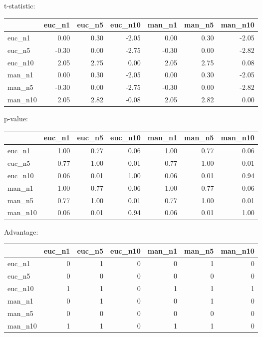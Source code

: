 t-statistic:
 \begin{tabular}{lrrrrrr}
\hline
         &   euc\_n1 &   euc\_n5 &   euc\_n10 &   man\_n1 &   man\_n5 &   man\_n10 \\
\hline
 euc\_n1  &     0.00 &     0.30 &     -2.05 &     0.00 &     0.30 &     -2.05 \\
 euc\_n5  &    -0.30 &     0.00 &     -2.75 &    -0.30 &     0.00 &     -2.82 \\
 euc\_n10 &     2.05 &     2.75 &      0.00 &     2.05 &     2.75 &      0.08 \\
 man\_n1  &     0.00 &     0.30 &     -2.05 &     0.00 &     0.30 &     -2.05 \\
 man\_n5  &    -0.30 &     0.00 &     -2.75 &    -0.30 &     0.00 &     -2.82 \\
 man\_n10 &     2.05 &     2.82 &     -0.08 &     2.05 &     2.82 &      0.00 \\
\hline
\end{tabular} 

p-value:
 \begin{tabular}{lrrrrrr}
\hline
         &   euc\_n1 &   euc\_n5 &   euc\_n10 &   man\_n1 &   man\_n5 &   man\_n10 \\
\hline
 euc\_n1  &     1.00 &     0.77 &      0.06 &     1.00 &     0.77 &      0.06 \\
 euc\_n5  &     0.77 &     1.00 &      0.01 &     0.77 &     1.00 &      0.01 \\
 euc\_n10 &     0.06 &     0.01 &      1.00 &     0.06 &     0.01 &      0.94 \\
 man\_n1  &     1.00 &     0.77 &      0.06 &     1.00 &     0.77 &      0.06 \\
 man\_n5  &     0.77 &     1.00 &      0.01 &     0.77 &     1.00 &      0.01 \\
 man\_n10 &     0.06 &     0.01 &      0.94 &     0.06 &     0.01 &      1.00 \\
\hline
\end{tabular} 

Advantage:
 \begin{tabular}{lrrrrrr}
\hline
         &   euc\_n1 &   euc\_n5 &   euc\_n10 &   man\_n1 &   man\_n5 &   man\_n10 \\
\hline
 euc\_n1  &        0 &        1 &         0 &        0 &        1 &         0 \\
 euc\_n5  &        0 &        0 &         0 &        0 &        0 &         0 \\
 euc\_n10 &        1 &        1 &         0 &        1 &        1 &         1 \\
 man\_n1  &        0 &        1 &         0 &        0 &        1 &         0 \\
 man\_n5  &        0 &        0 &         0 &        0 &        0 &         0 \\
 man\_n10 &        1 &        1 &         0 &        1 &        1 &         0 \\
\hline
\end{tabular} 

